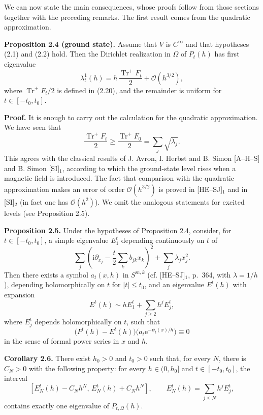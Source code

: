 \documentclass[11pt]{article}
\newcommand{\Trp}{\operatorname{Tr}^{+}}
\newcommand{\OO}{\mathcal O}
\newcommand{\ii}{\mathrm{i}}
\newcommand{\e}{\mathrm{e}}
\begin{document}
We can now state the main consequences, whose proofs follow from those sections together with the preceding remarks. The first result comes from the quadratic approximation.

\medskip
\noindent\textbf{Proposition 2.4 (ground state).}
Assume that $V$ is $C^\infty$ and that hypotheses (2.1) and (2.2) hold. Then the Dirichlet realization in $\Omega$ of $P_t(h)$ has first eigenvalue
\begin{equation}
\lambda_t^1(h)=h\,\frac{\Trp F_t}{2}+\OO(h^{3/2}),
\tag{2.32}
\end{equation}
where $\Trp F_t/2$ is defined in (2.20), and the remainder is uniform for $t\in[-t_0,t_0]$.

\noindent\textbf{Proof.}
It is enough to carry out the calculation for the quadratic approximation. We have seen that
\[
\frac{\Trp F_t}{2}\ge\frac{\Trp F_0}{2}=\sum_j\sqrt{\lambda_j}.
\]
This agrees with the classical results of J. Avron, I. Herbst and B. Simon [A--H--S] and B. Simon [SI]$_1$, according to which the ground-state level rises when a magnetic field is introduced. The fact that comparison with the quadratic approximation makes an error of order $\OO(h^{3/2})$ is proved in [HE--SJ]$_1$ and in [SI]$_2$ (in fact one has $\OO(h^2)$).
We omit the analogous statements for excited levels (see Proposition 2.5).

\medskip
\noindent\textbf{Proposition 2.5.}
Under the hypotheses of Proposition 2.4, consider, for $t\in[-t_0,t_0]$, a simple eigenvalue $E_1^t$ depending continuously on $t$ of
\[
\sum_j\left(\ii\partial_{x_j}-\frac t2\sum_k b_{jk}x_k\right)^2
+\sum_j\lambda_jx_j^2.
\]
Then there exists a symbol $a_t(x,h)$ in $S^{m,k}$ (cf. [HE--SJ]$_1$, p.~364, with $\lambda=1/h$), depending holomorphically on $t$ for $|t|\le t_0$, and an eigenvalue $E^t(h)$ with expansion
\[
E^t(h)\sim hE_1^t+\sum_{j\ge2}h^jE_j^t,
\]
where $E_j^t$ depends holomorphically on $t$, such that
\begin{equation}
\bigl(P^t(h)-E^t(h)\bigr)
\bigl(a_t\e^{-\psi_t(x)/h}\bigr)\equiv0
\tag{2.33}
\end{equation}
in the sense of formal power series in $x$ and $h$.

\medskip
\noindent\textbf{Corollary 2.6.}
There exist $h_0>0$ and $t_0>0$ such that, for every $N$, there is $C_N>0$ with the following property: for every $h\in(0,h_0]$ and $t\in[-t_0,t_0]$, the interval
\[
[E_N^t(h)-C_Nh^N,\,E_N^t(h)+C_Nh^N],
\qquad
E_N^t(h)=\sum_{j\le N}h^jE_j^t,
\]
contains exactly one eigenvalue of $P_{t,\Omega}(h)$.
\end{document}
